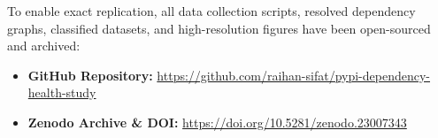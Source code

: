 \documentclass[conference]{IEEEtran}
\begin{document}
To enable exact replication, all data collection scripts, resolved dependency graphs, classified datasets, and high-resolution figures have been open-sourced and archived:
\begin{itemize}
    \item \textbf{GitHub Repository:} \url{https://github.com/raihan-sifat/pypi-dependency-health-study}
    \item \textbf{Zenodo Archive \& DOI:} \url{https://doi.org/10.5281/zenodo.23007343}
\end{itemize}



\end{document}
